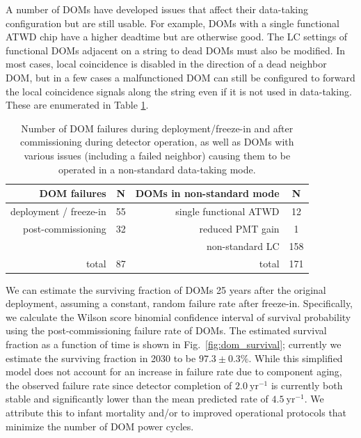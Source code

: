 A number of DOMs have developed issues that affect their data-taking
configuration but are still usable.  For example, DOMs with a single functional
ATWD chip have a higher deadtime but are otherwise good.  The LC settings of functional DOMs adjacent on a string to
dead DOMs must also be modified. In most cases, local coincidence is
disabled in the direction of a dead neighbor DOM, but in a few cases a
malfunctioned DOM can still be configured to forward the local
coincidence signals along the string even if it is not used in
data-taking. These are enumerated in Table \ref{tab:dom_failures}.  

\begin{table}[h]
  \centering
  \caption{Number of DOM failures during deployment/freeze-in and after
    commissioning during detector operation, as well as DOMs with various
    issues (including a failed neighbor) causing them to be operated in a
    non-standard data-taking mode.} 
  \label{tab:dom_failures}
  \begin{tabular}{rc|rc}
    \toprule
    DOM failures & N & DOMs in non-standard mode & N\\
    \hline    
    deployment / freeze-in & 55 &single functional ATWD & 12\\
    post-commissioning & 32  & reduced PMT gain & 1 \\
   & & non-standard LC & 158 \\
 total & 87 & total& 171\\
    \bottomrule 
  \end{tabular}
\end{table}

We can estimate the surviving fraction of DOMs 25 years after the original
deployment, assuming a constant, random failure rate after freeze-in.
Specifically, we calculate the Wilson score binomial confidence interval \cite{Wilson_Score} of
survival probability using the post-commissioning failure rate of DOMs.
The estimated survival fraction as a function of 
time is shown in Fig.~\ref{fig:dom_survival}; currently we estimate the
surviving fraction in 2030 to be $97.3\pm0.3\%$.  While this simplified
model does not account for an increase in failure rate due to component aging, the
observed failure rate since detector completion of $2.0~\mathrm{yr}^{-1}$ is
currently both stable and significantly lower than the mean predicted rate
of $4.5~\mathrm{yr}^{-1}$.  We attribute 
this to infant mortality and/or to improved operational protocols that
minimize the number of DOM power cycles.

